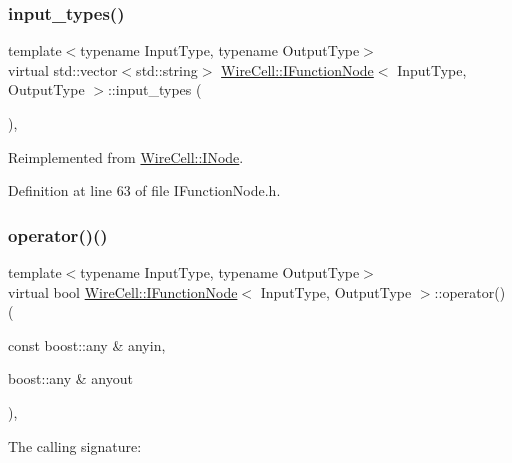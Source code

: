 \subsubsection{\texorpdfstring{input\+\_\+types()}{input\_types()}}
{\footnotesize\ttfamily template$<$typename Input\+Type, typename Output\+Type$>$ \\
virtual std\+::vector$<$std\+::string$>$ \hyperlink{class_wire_cell_1_1_i_function_node}{Wire\+Cell\+::\+I\+Function\+Node}$<$ Input\+Type, Output\+Type $>$\+::input\+\_\+types (\begin{DoxyParamCaption}{ }\end{DoxyParamCaption})\hspace{0.3cm}{\ttfamily [inline]}, {\ttfamily [virtual]}}



Reimplemented from \hyperlink{class_wire_cell_1_1_i_node_ae13fc140c8e815fac9327dfa5b43f853}{Wire\+Cell\+::\+I\+Node}.



Definition at line 63 of file I\+Function\+Node.\+h.

\mbox{\label{class_wire_cell_1_1_i_function_node_a93547dd6b1a2a44dfc9d5fb458d2ef04}} 
\subsubsection{\texorpdfstring{operator()()}{operator()()}\hspace{0.1cm}{\footnotesize\ttfamily [1/2]}}
{\footnotesize\ttfamily template$<$typename Input\+Type, typename Output\+Type$>$ \\
virtual bool \hyperlink{class_wire_cell_1_1_i_function_node}{Wire\+Cell\+::\+I\+Function\+Node}$<$ Input\+Type, Output\+Type $>$\+::operator() (\begin{DoxyParamCaption}\item[{const boost\+::any \&}]{anyin,  }\item[{boost\+::any \&}]{anyout }\end{DoxyParamCaption})\hspace{0.3cm}{\ttfamily [inline]}, {\ttfamily [virtual]}}



The calling signature\+: 



